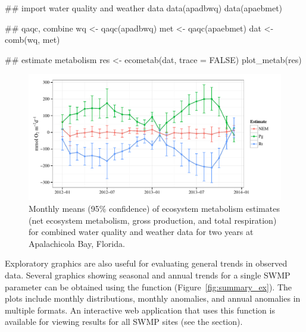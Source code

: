 \begin{example}
## import water quality and weather data
data(apadbwq)
data(apaebmet)

## qaqc, combine
wq <- qaqc(apadbwq)
met <- qaqc(apaebmet)
dat <- comb(wq, met)

## estimate metabolism
res <- ecometab(dat, trace = FALSE)
plot_metab(res)
\end{example}
\begin{figure}[!h]

{\centering \includegraphics[width=\textwidth]{metab_ex-1} 

}

\caption[Monthly means (95\% confidence) of ecosystem metabolism estimates (net ecosystem metabolism, gross production, and total respiration) for combined water quality and weather data for two years at Apalachicola Bay, Florida]{Monthly means (95\% confidence) of ecosystem metabolism estimates (net ecosystem metabolism, gross production, and total respiration) for combined water quality and weather data for two years at Apalachicola Bay, Florida.}\label{fig:metab_ex}
\end{figure}

Exploratory graphics are also useful for evaluating general trends in observed data.  Several graphics showing seasonal and annual trends for a single SWMP parameter can be obtained using the  function (Figure~\ref{fig:summary_ex}).  The plots include monthly distributions, monthly anomalies, and annual anomalies in multiple formats.  An interactive  web application \citep{Chang15} that uses this function is available for viewing results for all SWMP sites (see the  section).

